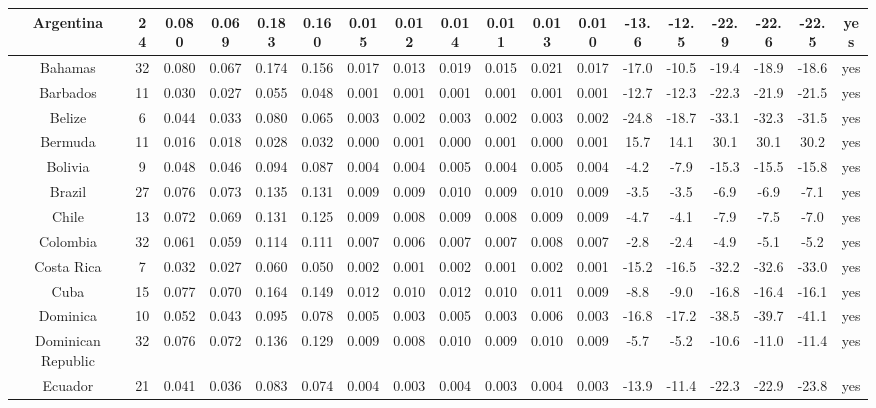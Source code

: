 \documentclass[10pt]{article}
\begin{document}
\begin{center}
\begin{tabular}{|c|c|c|c|c|c|c|c|c|c|c|c|c|c|c|c|c|c|}
\hline
Argentina & 24 & 0.080 & 0.069 & 0.183 & 0.160 & 0.015 & 0.012 & 0.014 & 0.011 & 0.013 & 0.010 & -13.6 & -12.5 & -22.9 & -22.6 & -22.5 & yes \\
\hline
Bahamas & 32 & 0.080 & 0.067 & 0.174 & 0.156 & 0.017 & 0.013 & 0.019 & 0.015 & 0.021 & 0.017 & -17.0 & -10.5 & -19.4 & -18.9 & -18.6 & yes \\
\hline
Barbados & 11 & 0.030 & 0.027 & 0.055 & 0.048 & 0.001 & 0.001 & 0.001 & 0.001 & 0.001 & 0.001 & -12.7 & -12.3 & -22.3 & -21.9 & -21.5 & yes \\
\hline
Belize & 6 & 0.044 & 0.033 & 0.080 & 0.065 & 0.003 & 0.002 & 0.003 & 0.002 & 0.003 & 0.002 & -24.8 & -18.7 & -33.1 & -32.3 & -31.5 & yes \\
\hline
Bermuda & 11 & 0.016 & 0.018 & 0.028 & 0.032 & 0.000 & 0.001 & 0.000 & 0.001 & 0.000 & 0.001 & 15.7 & 14.1 & 30.1 & 30.1 & 30.2 & yes \\
\hline
Bolivia & 9 & 0.048 & 0.046 & 0.094 & 0.087 & 0.004 & 0.004 & 0.005 & 0.004 & 0.005 & 0.004 & -4.2 & -7.9 & -15.3 & -15.5 & -15.8 & yes \\
\hline
Brazil & 27 & 0.076 & 0.073 & 0.135 & 0.131 & 0.009 & 0.009 & 0.010 & 0.009 & 0.010 & 0.009 & -3.5 & -3.5 & -6.9 & -6.9 & -7.1 & yes \\
\hline
Chile & 13 & 0.072 & 0.069 & 0.131 & 0.125 & 0.009 & 0.008 & 0.009 & 0.008 & 0.009 & 0.009 & -4.7 & -4.1 & -7.9 & -7.5 & -7.0 & yes \\
\hline
Colombia & 32 & 0.061 & 0.059 & 0.114 & 0.111 & 0.007 & 0.006 & 0.007 & 0.007 & 0.008 & 0.007 & -2.8 & -2.4 & -4.9 & -5.1 & -5.2 & yes \\
\hline
Costa Rica & 7 & 0.032 & 0.027 & 0.060 & 0.050 & 0.002 & 0.001 & 0.002 & 0.001 & 0.002 & 0.001 & -15.2 & -16.5 & -32.2 & -32.6 & -33.0 & yes \\
\hline
Cuba & 15 & 0.077 & 0.070 & 0.164 & 0.149 & 0.012 & 0.010 & 0.012 & 0.010 & 0.011 & 0.009 & -8.8 & -9.0 & -16.8 & -16.4 & -16.1 & yes \\
\hline
Dominica & 10 & 0.052 & 0.043 & 0.095 & 0.078 & 0.005 & 0.003 & 0.005 & 0.003 & 0.006 & 0.003 & -16.8 & -17.2 & -38.5 & -39.7 & -41.1 & yes \\
\hline
Dominican Republic & 32 & 0.076 & 0.072 & 0.136 & 0.129 & 0.009 & 0.008 & 0.010 & 0.009 & 0.010 & 0.009 & -5.7 & -5.2 & -10.6 & -11.0 & -11.4 & yes \\
\hline
Ecuador & 21 & 0.041 & 0.036 & 0.083 & 0.074 & 0.004 & 0.003 & 0.004 & 0.003 & 0.004 & 0.003 & -13.9 & -11.4 & -22.3 & -22.9 & -23.8 & yes \\

\end{tabular}
\end{center}
\end{document}
